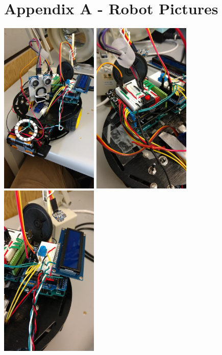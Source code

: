 \documentclass[paper=a4, fontsize=11pt]{scrartcl}
\numberwithin{equation}{section}		%
\numberwithin{figure}{section}			%
\numberwithin{table}{section}				%
\begin{document}
{\section{Appendix A - Robot Pictures}
\includegraphics[width=0.35\textwidth]{1.jpg}
\includegraphics[width=0.35\textwidth]{2.jpg}\\
\includegraphics[width=0.35\textwidth]{3.jpg}
}
\end{document}
